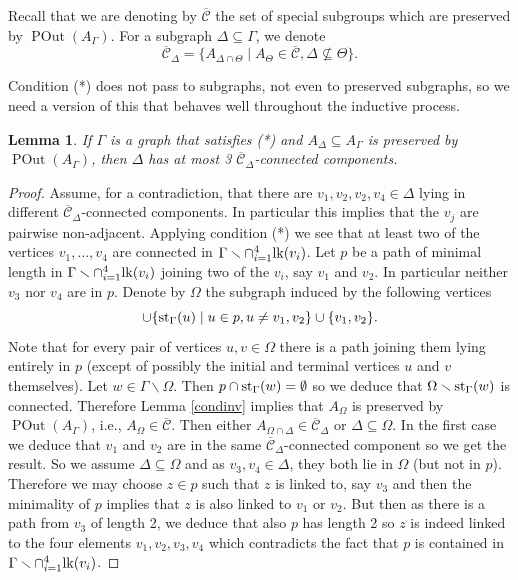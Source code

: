 \documentclass[10pt]{amsart}
\newtheorem{lemma}[theorem]{Lemma}
\theoremstyle{definition}
\newcommand{\lk}{{\rm lk}}
\newcommand{\st}{{\rm st}}
\newcommand{\POut}{\operatorname {POut}}
\theoremstyle{definition}
\numberwithin{equation}{section}
\begin{document}
 Recall that we are denoting by $\overline{\mathcal{C}}$ the set of special subgroups which are preserved by $\POut(A_\Gamma)$. For a subgraph $\Delta\subseteq\Gamma$, we denote
 \[\overline{\mathcal{C}}_\Delta=\{A_{\Delta\cap\Theta}\mid A_\Theta\in \overline{\mathcal{C}}, \Delta\not\subseteq\Theta\}.\]

  Condition (*) does not pass to subgraphs, not even to preserved subgraphs, so we need a version of this that behaves well throughout the inductive process.


\begin{lemma}\label{connectedcomponents*} If $\Gamma$ is a graph that satisfies (*) and $A_\Delta\subseteq A_\Gamma$ is preserved by $\POut(A_\Gamma)$, then $\Delta$ has at most 3 $\overline{\mathcal{C}}_\Delta$-connected components.
\end{lemma}
\begin{proof} Assume, for a contradiction, that there are $v_1,v_2,v_2,v_4\in\Delta$ lying in different $\overline{\mathcal{C}}_\Delta$-connected components. In particular this implies that the $v_j$ are pairwise non-adjacent. %
Applying condition (*) we see that at least two of the vertices $v_1,\ldots,v_4$ are connected in  $\Gamma\smallsetminus\cap_{i=1}^4\lk(v_i)$. Let $p$ be a path of minimal length in $\Gamma\smallsetminus\cap_{i=1}^4\lk(v_i)$ joining two of the $v_i$, say $v_1$ and $v_2$. In particular neither $v_3$ nor $v_4$ are in $p$. Denote by $\Omega$ the subgraph induced by the following vertices
\[\cup\{\st_\Gamma(u)\mid u\in p,u\neq v_1,v_2\}\cup\{v_1,v_2\}.\]
Note that for every pair of vertices $u,v\in\Omega$ there is a path joining them lying entirely in $p$ (except of possibly the initial and terminal vertices  $u$ and $v$ themselves).
Let $w\in\Gamma\smallsetminus\Omega$. Then $p\cap\st_\Gamma(w)=\emptyset$ so we deduce that $\Omega\smallsetminus\st_\Gamma(w)$ is connected. Therefore Lemma \ref{condinv} implies that $A_\Omega$ is preserved by $\POut(A_\Gamma)$, i.e., $A_\Omega\in\overline{\mathcal{C}}$. Then either $A_{\Omega\cap\Delta}\in\overline{\mathcal{C}}_\Delta$ or $\Delta\subseteq\Omega$. In the first case we deduce that $v_1$ and $v_2$ are in the same $\overline{\mathcal{C}}_\Delta$-connected component so we get the result. So we assume $\Delta\subseteq\Omega$  and as $v_3,v_4\in\Delta$, they both lie in $\Omega$ (but not in $p$). Therefore we may choose $z\in p$ such that $z$ is linked to, say $v_3$ and then the minimality of $p$ implies that $z$ is also linked to $v_1$ or $v_2$. But then as there is a path from $v_3$ of length 2, we deduce that also $p$ has length 2 so $z$ is indeed linked to the four elements $v_1,v_2,v_3,v_4$ which contradicts the fact that $p$ is contained in $\Gamma\smallsetminus\cap_{i=1}^4\lk(v_i)$.
\end{proof}
 
\end{document}
